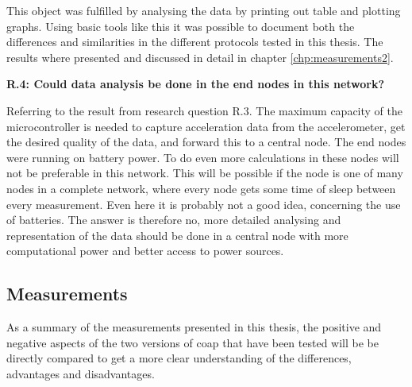 \noindent This object was fulfilled by analysing the data by printing out table and plotting graphs. Using basic tools like this it was possible to document both the differences and similarities in the different protocols tested in this thesis. The results where presented and discussed in detail in chapter \ref{chp:measurements2}.

\noindent\textbf{R.4: Could data analysis be done in the end nodes in this network?}

\noindent Referring to the result from research question R.3. The maximum capacity of the \gls{microcontroller} is needed to capture acceleration data from the accelerometer, get the desired quality of the data, and forward this to a central node. The end nodes were running on battery power.  To do even more calculations in these nodes will not be preferable in this network. This will be possible if the node is one of many nodes in a complete network, where every node gets some time of sleep between every measurement. Even here it is probably not a good idea, concerning the use of batteries. The answer is therefore no, more detailed analysing and representation of the data should be done in a central node with more computational power and better access to power sources. 

\newpage
\subsection{Measurements}


\noindent As a summary of the measurements presented in this thesis, the positive and negative aspects of the two versions of \gls{coap} that have been tested will be be directly compared to get a more clear understanding of the differences, advantages and disadvantages.


